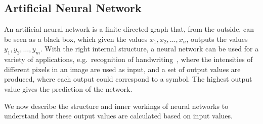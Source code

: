\subsection{Artificial Neural Network}
An artificial neural network is a finite directed graph that, from the outside, can be seen as a black box, which given the values $x_1, x_2, \dots, x_n$, outputs the values $y_1, y_2, \dots, y_m$. With the right internal structure, a neural network can be used for a variety of applications, e.g.\ recognition of handwriting~\cite{Widrow:1994:NNA:175247.175257}, where the intensities of different pixels in an image are used as input, and a set of output values are produced, where each output could correspond to a symbol. The highest output value gives the prediction of the network.

We now describe the structure and inner workings of neural networks to understand how these output values are calculated based on input values.

